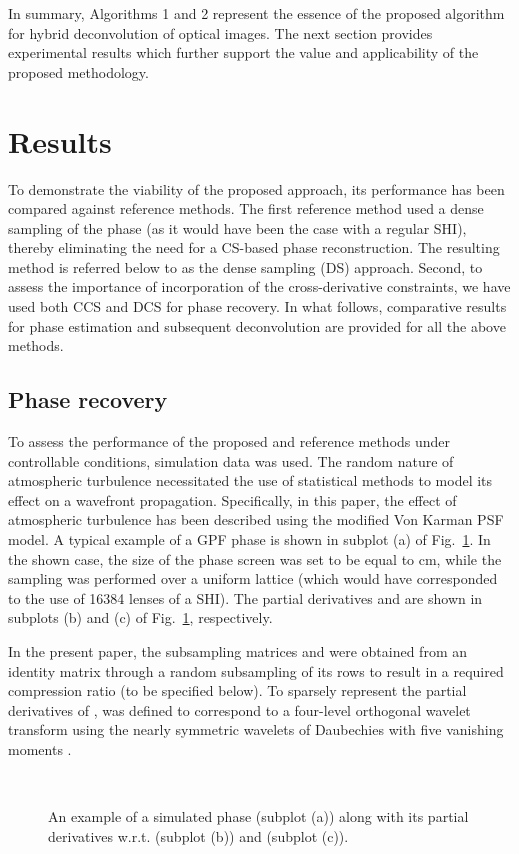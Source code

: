 \pdfoutput=1 \documentclass[journal]{IEEEtran}
\begin{document}
In summary, Algorithms 1 and 2 represent the essence of the proposed algorithm for hybrid deconvolution of optical images. The next section provides experimental results which further support the value and applicability of the proposed methodology.

\section{Results}
To demonstrate the viability of the proposed approach, its performance has been compared against reference methods. The first reference method used a dense sampling of the phase (as it would have been the case with a regular SHI), thereby eliminating the need for a CS-based phase reconstruction. The resulting method is referred below to as the dense sampling (DS) approach. Second, to assess the importance of incorporation of the cross-derivative constraints, we have used both CCS and DCS for phase recovery. In what follows, comparative results for phase estimation and subsequent deconvolution are provided for all the above methods.

\subsection{Phase recovery}
To assess the performance of the proposed and reference methods under controllable conditions, simulation data was used. The random nature of atmospheric turbulence necessitated the use of statistical methods to model its effect on a wavefront propagation. Specifically, in this paper, the effect of atmospheric turbulence has been described using the modified Von Karman PSF model\cite{35}. A typical example of a GPF phase  is shown in subplot (a) of Fig.~\ref{F3}. In the shown case, the size of the phase screen was set to be equal to  cm, while the sampling was performed over a  uniform lattice (which would have corresponded to the use of 16384 lenses of a SHI). The partial derivatives  and  are shown in subplots (b) and (c) of Fig.~\ref{F3}, respectively.

In the present paper, the subsampling matrices  and  were obtained from an identity matrix  through a random subsampling of its rows to result in a required compression ratio  (to be specified below). To sparsely represent the partial derivatives of ,  was defined to correspond to a four-level orthogonal wavelet transform using the nearly symmetric wavelets of Daubechies with five vanishing moments \cite{92}.

\begin{figure}[t]
\centering
{}
\\
\caption{An example of a simulated phase  (subplot (a)) along with its partial derivatives w.r.t.  (subplot (b)) and  (subplot (c)).}
\label{F3}
\end{figure}
\end{document}
